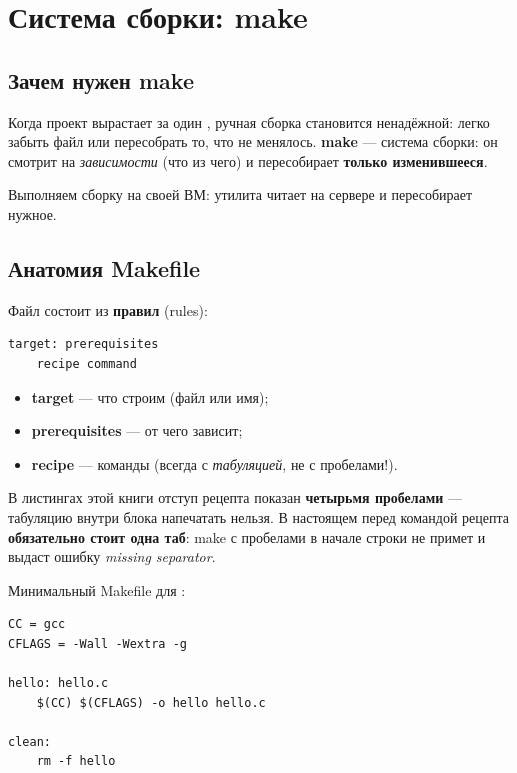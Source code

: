 \chapter{Система сборки: make}
\label{ch:14-make}

\section{Зачем нужен make}

Когда проект вырастает за один , ручная сборка
становится ненадёжной: легко забыть файл или пересобрать
то, что не менялось. \textbf{make} --- система сборки:
он смотрит на \emph{зависимости} (что из чего) и
пересобирает \textbf{только изменившееся}.

Выполняем сборку на своей ВМ: утилита  читает
 на сервере  и пересобирает нужное.

\section{Анатомия Makefile}

Файл  состоит из \textbf{правил}
(rules):
\begin{verbatim}
target: prerequisites
    recipe command
\end{verbatim}

\begin{itemize}
  \item \textbf{target} --- что строим (файл или имя);
  \item \textbf{prerequisites} --- от чего зависит;
  \item \textbf{recipe} --- команды (всегда с \emph{табуляцией},
    не с пробелами!).
\end{itemize}

\begin{warnbox}
В листингах этой книги отступ рецепта показан \textbf{четырьмя
пробелами} --- табуляцию внутри блока напечатать нельзя. В настоящем
 перед командой рецепта \textbf{обязательно стоит
одна таб}: make с пробелами в начале строки не примет и выдаст
ошибку \emph{missing separator}.
\end{warnbox}

Минимальный Makefile для :
\begin{verbatim}
CC = gcc
CFLAGS = -Wall -Wextra -g

hello: hello.c
    $(CC) $(CFLAGS) -o hello hello.c

clean:
    rm -f hello
\end{verbatim}

